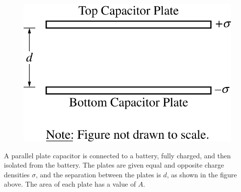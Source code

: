 %
\begin{figure}[H]
\centering
\includegraphics[scale=0.3]{images/img-026-041.png}
\end{figure}

\question
A parallel plate capacitor is connected to a battery, fully charged, and then isolated from the battery. The plates are given equal and opposite charge densities $\sigma$, and the separation between the plates is $d$, as shown in the figure above. The area of each plate has a value of $A$. %

